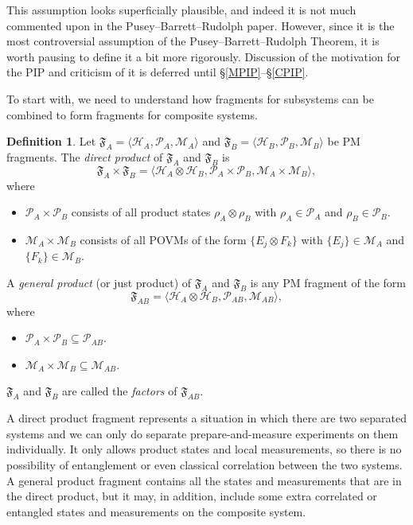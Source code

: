 \documentclass[DIV=calc,paper=a4,fontsize=11pt,twocolumn]{scrartcl} %
\theoremstyle{definition}
\newtheorem{definition}{Definition}[section]
\theoremstyle{plain}
\newcommand{\Hilb}[1][]{\ensuremath{\mathcal{H}_{#1}}}
\begin{document}
This assumption looks superficially plausible, and indeed it is not
much commented upon in the Pusey--Barrett--Rudolph paper.  However, since it is the most
controversial assumption of the Pusey--Barrett--Rudolph Theorem, it is worth pausing to
define it a bit more rigorously.  Discussion of the motivation for the
PIP and criticism of it is deferred until \S\ref{MPIP}--\S\ref{CPIP}.

To start with, we need to understand how fragments for subsystems
can be combined to form fragments for composite systems.
\begin{definition}
Let $\mathfrak{F}_A = \langle \Hilb[A], \mathcal{P}_A, \mathcal{M}_A
\rangle$ and $\mathfrak{F}_B = \langle \Hilb[B], \mathcal{P}_B,
\mathcal{M}_B \rangle$ be PM fragments.  The \emph{direct product}
of $\mathfrak{F}_A$ and $\mathfrak{F}_B$ is
\begin{equation}
\mathfrak{F}_A \times \mathfrak{F}_B = \langle \Hilb[A] \otimes
\Hilb[B], \mathcal{P}_A \times \mathcal{P}_B, \mathcal{M}_A \times
\mathcal{M}_B \rangle,
\end{equation}
where
\begin{itemize}
\item $\mathcal{P}_A \times \mathcal{P}_B$ consists of all product
states $\rho_A \otimes \rho_B$ with $\rho_A \in \mathcal{P}_A$ and
$\rho_B \in \mathcal{P}_B$.
\item $\mathcal{M}_A \times \mathcal{M}_B$ consists of all POVMs of
the form $\{E_j \otimes F_k\}$ with $\{E_j\} \in \mathcal{M}_A$
and $\{F_k\} \in \mathcal{M}_B$.
\end{itemize}

A \emph{general product} (or just product) of $\mathfrak{F}_A$ and
$\mathfrak{F}_B$ is any PM fragment of the form
\begin{equation}
\mathfrak{F}_{AB} = \langle \Hilb[A] \otimes \Hilb[B],
\mathcal{P}_{AB}, \mathcal{M}_{AB} \rangle,
\end{equation}
where
\begin{itemize}
\item $\mathcal{P}_A \times \mathcal{P}_B \subseteq
\mathcal{P}_{AB}$.
\item $\mathcal{M}_A \times \mathcal{M}_B \subseteq
\mathcal{M}_{AB}$.
\end{itemize}

$\mathfrak{F}_A$ and $\mathfrak{F}_B$ are called the \emph{factors}
of $\mathfrak{F}_{AB}$.
\end{definition}

A direct product fragment represents a situation in which there are
two separated systems and we can only do separate prepare-and-measure
experiments on them individually.  It only allows product states and
local measurements, so there is no possibility of entanglement or even
classical correlation between the two systems.  A general product
fragment contains all the states and measurements that are in the
direct product, but it may, in addition, include some extra correlated
or entangled states and measurements on the composite system.
\end{document}
